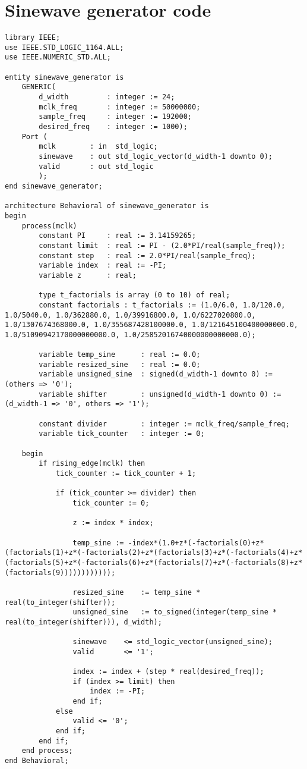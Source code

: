\section*{Sinewave generator code}
\begin{lstlisting}
library IEEE;
use IEEE.STD_LOGIC_1164.ALL;
use IEEE.NUMERIC_STD.ALL;

entity sinewave_generator is
    GENERIC(
        d_width         : integer := 24;
        mclk_freq       : integer := 50000000;
        sample_freq     : integer := 192000;
        desired_freq    : integer := 1000);
    Port (
        mclk        : in  std_logic;
        sinewave    : out std_logic_vector(d_width-1 downto 0);
        valid       : out std_logic
        ); 
end sinewave_generator;

architecture Behavioral of sinewave_generator is
begin
    process(mclk)
        constant PI     : real := 3.14159265;
        constant limit  : real := PI - (2.0*PI/real(sample_freq));
        constant step   : real := 2.0*PI/real(sample_freq);
        variable index  : real := -PI;
        variable z      : real;

        type t_factorials is array (0 to 10) of real;
        constant factorials : t_factorials := (1.0/6.0, 1.0/120.0, 1.0/5040.0, 1.0/362880.0, 1.0/39916800.0, 1.0/6227020800.0, 1.0/1307674368000.0, 1.0/355687428100000.0, 1.0/121645100400000000.0, 1.0/51090942170000000000.0, 1.0/25852016740000000000000.0);

        variable temp_sine      : real := 0.0;
        variable resized_sine   : real := 0.0;
        variable unsigned_sine  : signed(d_width-1 downto 0) := (others => '0');
        variable shifter        : unsigned(d_width-1 downto 0) := (d_width-1 => '0', others => '1');

        constant divider        : integer := mclk_freq/sample_freq;
        variable tick_counter   : integer := 0;

    begin
        if rising_edge(mclk) then
            tick_counter := tick_counter + 1;

            if (tick_counter >= divider) then
                tick_counter := 0;

                z := index * index;

                temp_sine := -index*(1.0+z*(-factorials(0)+z*(factorials(1)+z*(-factorials(2)+z*(factorials(3)+z*(-factorials(4)+z*(factorials(5)+z*(-factorials(6)+z*(factorials(7)+z*(-factorials(8)+z*(factorials(9))))))))))));

                resized_sine    := temp_sine * real(to_integer(shifter));
                unsigned_sine   := to_signed(integer(temp_sine * real(to_integer(shifter))), d_width);

                sinewave    <= std_logic_vector(unsigned_sine);
                valid       <= '1';

                index := index + (step * real(desired_freq));
                if (index >= limit) then
                    index := -PI;
                end if;
            else
                valid <= '0';
            end if;
        end if;
    end process;
end Behavioral;
\end{lstlisting}
